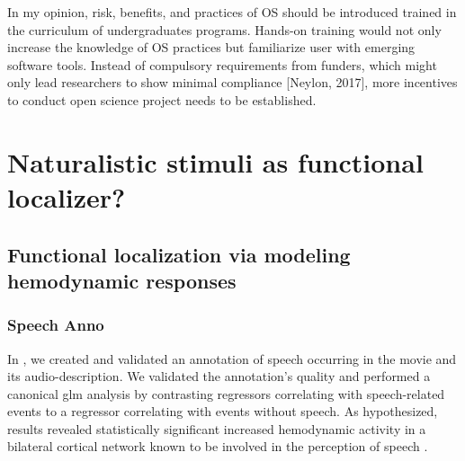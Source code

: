 
In my opinion, risk, benefits, and practices of OS should be introduced trained
in the curriculum of undergraduates programs.
%
Hands-on training would not only increase the knowledge of OS practices but
familiarize user with emerging software tools.
%
Instead of compulsory requirements from funders, which might only lead
researchers to show minimal compliance [Neylon, 2017], more incentives to
conduct open science project needs to be established.



\section{Naturalistic stimuli as functional localizer?}

\subsection{Functional localization via modeling hemodynamic responses}





\subsubsection{Speech Anno}


In \citep{haeusler2021speechanno}, we created and validated an annotation of
speech occurring in the movie and its audio-description.
We validated the annotation's quality \citep{haeusler2021speechanno} and
performed a canonical \ac{glm} analysis by contrasting regressors correlating
with speech-related events to a regressor correlating with events without
speech.
As hypothesized, results revealed statistically significant increased
hemodynamic activity in a bilateral cortical network known to be involved in the
perception of speech \citep[e.g.,][]{friederici2011brain, wilson2008beyond}.

